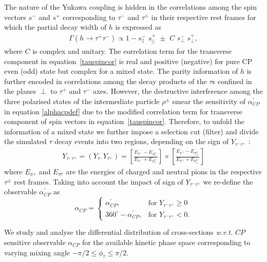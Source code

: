 \documentclass[pdftex,twocolumn,epjc3]{svjour3}          %
\newcommand{ \bea}{  \begin{eqnarray}}
\newcommand{ \eea}{\end{eqnarray}}
\begin{document}
\par The  nature of the Yukawa coupling  is hidden in the correlations among the spin vectors $s^-$  and  $s^+$ corresponding to $\tau^-$ and $\tau^+$ in their respective rest frames for which  the partial decay width of $h$ is expressed as
\bea
\Gamma\left(h\to \tau^+\tau^-\right) \propto 1- s^-_{||}\,\, s^+_{||}\,\,\pm \,\,C\,\, s^-_\perp\,\, s^+_\perp, \label{tauspincor}
\eea
where $C$ is complex and unitary. The correlation term for the transverse component in equation~\eqref{tauspincor}  is real and positive (negative) for pure CP even (odd) state but complex for a mixed state. The parity information of $h$ is further encoded in correlations among  the decay products of the $\tau$s  confined in the planes $\perp$ to $\tau^+$ and $\tau^-$ axes. However, the destructive interference among the three  polarised states of the intermediate particle $\rho^\pm$ smear the sensitivity of $\alpha_{CP}^\prime$ in equation \eqref{alphacpdef} due to the modified  correlation term for  transverse component of spin vectors  in equation~\eqref{tauspincor}. Therefore, to unfold the information of a mixed state  we  further impose a  selection cut (filter) and  divide the simulated $\tau$ decay events into two regions, depending on the sign of $Y_{\tau^-\tau^+}$ \cite{Desch:2003rw,Han:2016bvf,CMS:2020rpr}: 
\begin{eqnarray}
Y_{\tau^-\tau^+} =\left(Y_{\tau^-} Y_{\tau^+}\right) = \left[\frac{E_{\pi^-}-E_{\pi^0_{\tau^-}}}{E_{\pi^-}+E_{\pi^0_{\tau^-}}}\right]\times
\left[\frac{E_{\pi^+}-E_{\pi^0_{\tau^+}}}{E_{\pi^+}+E_{\pi^0_{\tau^+}}}\right]\end{eqnarray}
where $E_{\pi^{\pm}}$ and $E_{\pi^0}$ are the energies of charged and neutral pions in the respective $\tau^\pm$ rest frames. Taking into account the impact of sign of $Y_{\tau^-\tau^+}$ we re-define  the observable $\alpha_{CP}^\prime$ as
\begin{equation}
\alpha_{CP}= 
\begin{cases}
\alpha_{CP}^\prime,& \text{for } Y_{\tau^-\tau^+} \geq 0\\
360^{\circ} - \alpha_{CP}^\prime,& \text{for } Y_{\tau^-\tau^+} < 0. \label{eq5}
\end{cases}
\end{equation}
%
\par We study and analyse the differential distribution of cross-sections {\it w.r.t.} $CP$ sensitive observable $\alpha_{CP}$ for the available kinetic phase space corresponding to varying mixing angle $-{\pi}/{2}\le \phi_\tau\le {\pi}/{2}$.
\end{document}
